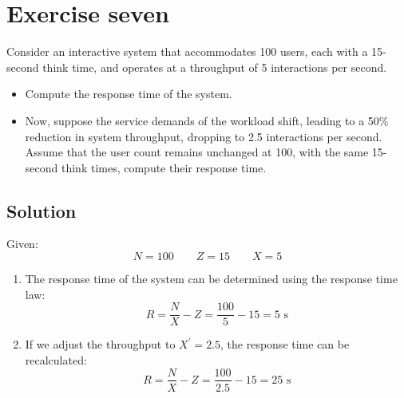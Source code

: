 \section{Exercise seven}

Consider an interactive system that accommodates 100 users, each with a 15-second think time, and operates at a throughput of 5 interactions per second.
\begin{itemize}
    \item Compute the response time of the system.
    \item Now, suppose the service demands of the workload shift, leading to a 50\% reduction in system throughput, dropping to 2.5 interactions per second. 
        Assume that the user count remains unchanged at 100, with the same 15-second think times, compute their response time.
\end{itemize}

\subsection*{Solution}
Given:
\[N=100 \qquad Z=15 \qquad X=5\]
\begin{enumerate}
    \item The response time of the system can be determined using the response time law:
        \[R=\dfrac{N}{X}-Z=\dfrac{100}{5}-15=5\text{ s}\]
    \item If we adjust the throughput to $X^\prime=2.5$, the response time can be recalculated:
        \[R=\dfrac{N}{X}-Z=\dfrac{100}{2.5}-15=25\text{ s}\]
\end{enumerate}